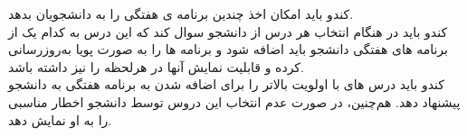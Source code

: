 \documentclass{report}
\begin{document}
                                                                                                                                                                                                                       \begin{adjustwidth}{2em}{0pt}
                                                                                                                                                                                                                        کندو باید امکان اخذ چندین برنامه ی هفتگی را به دانشجویان بدهد.                                                                                                                                                                                                                        
                                                                     \\
                                                                                                                                                                                                                        کندو باید در هنگام انتخاب هر درس از دانشجو سوال کند که این درس به کدام یک از برنامه های هفتگی دانشجو باید اضافه شود و برنامه ها را به صورت پویا به‌روزرسانی کرده و قابلیت نمایش آنها در هرلحظه را نیز داشته باشد.\\
                                                                                                                                                                                                                        کندو باید درس های با اولویت بالاتر را برای اضافه شدن به برنامه هفتگی به دانشجو پیشنهاد دهد. هم‌چنین، در صورت عدم انتخاب این دروس توسط دانشجو اخطار مناسبی را به او نمایش دهد.\\

\end{adjustwidth}
\end{document}
